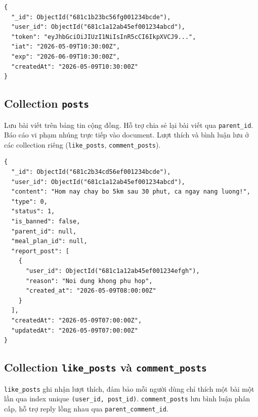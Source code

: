 \begin{verbatim}
{
  "_id": ObjectId("681c1b23bc56fg001234bcde"),
  "user_id": ObjectId("681c1a12ab45ef001234abcd"),
  "token": "eyJhbGciOiJIUzI1NiIsInR5cCI6IkpXVCJ9...",
  "iat": "2026-05-09T10:30:00Z",
  "exp": "2026-06-09T10:30:00Z",
  "createdAt": "2026-05-09T10:30:00Z"
}
\end{verbatim}

\subsection{Collection \texttt{posts}}
\label{subsec:col_posts}

Lưu bài viết trên bảng tin cộng đồng. Hỗ trợ chia sẻ lại bài viết qua \texttt{parent\_id}. Báo cáo vi phạm nhúng trực tiếp vào document. Lượt thích và bình luận lưu ở các collection riêng (\texttt{like\_posts}, \texttt{comment\_posts}).

\begin{verbatim}
{
  "_id": ObjectId("681c2b34cd56ef001234bcde"),
  "user_id": ObjectId("681c1a12ab45ef001234abcd"),
  "content": "Hom nay chay bo 5km sau 30 phut, ca ngay nang luong!",
  "type": 0,
  "status": 1,
  "is_banned": false,
  "parent_id": null,
  "meal_plan_id": null,
  "report_post": [
    {
      "user_id": ObjectId("681c1a12ab45ef001234efgh"),
      "reason": "Noi dung khong phu hop",
      "created_at": "2026-05-09T08:00:00Z"
    }
  ],
  "createdAt": "2026-05-09T07:00:00Z",
  "updatedAt": "2026-05-09T07:00:00Z"
}
\end{verbatim}

\subsection{Collection \texttt{like\_posts} và \texttt{comment\_posts}}
\label{subsec:col_interactions}

\texttt{like\_posts} ghi nhận lượt thích, đảm bảo mỗi người dùng chỉ thích một bài một lần qua index unique \texttt{(user\_id, post\_id)}. \texttt{comment\_posts} lưu bình luận phân cấp, hỗ trợ reply lồng nhau qua \texttt{parent\_comment\_id}.


